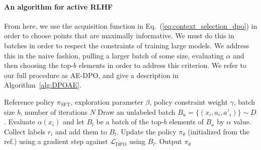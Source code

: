 \documentclass{article} \usepackage{iclr2023_conference,times}
\def\eqref#1{Eq.~(\ref{#1})}
\newcommand{\dpoae}{AE-DPO}
\newcommand{\dpoloss}{\mathcal{L}_{\text{DPO}}}
\newcommand{\sftpolicy}{\pi_{\text{SFT}}}
\begin{document}
\vspace{-2mm}
\paragraph{An algorithm for active RLHF}
From here, we use the acquisition function in \eqref{eq:context_selection_dpo} in order to choose points that are maximally informative. We must do this in batches in order to respect the constraints of training large models. We address this in the naive fashion, pulling a larger batch of some size, evaluating $\alpha$ and then choosing the top-$b$ elements in order to address this criterion. We refer to our full procedure as AE-DPO, and give a description in Algorithm~\ref{alg:DPOAE}.
\begin{algorithm}[t!]
    \caption{\dpoae}
    \label{alg:DPOAE}
    \begin{algorithmic}[1]  Reference policy $\sftpolicy$, exploration parameter $\beta$, policy constraint weight $\gamma$, batch size $b$, number of iterations $N$
            \STATE Draw an unlabeled batch $B_u = \{(x_i, a_i, a'_i)\} \sim D$.
            \STATE Evaluate $\alpha(x_i)$ and let $B_l$ be a batch of the top-$b$ elements of $B_u$ by $\alpha$ value.
            \STATE Collect labels $r_i$ and add them to $B_l$.
            \STATE Update the policy $\pi_\theta$ (initialized from the ref.) using a gradient step against $\dpoloss$ using $B_l$.
        \ENDFOR
        \STATE Output $\pi_\theta$
    \end{algorithmic}
\end{algorithm}
\end{document}
